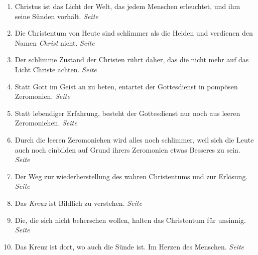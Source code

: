 \begin{enumerate}
 \item Christus ist das Licht der Welt, das jedem Menschen erleuchtet, und ihm
seine Sünden vorhält.
 \dotfill \textit{Seite \pageref{ref:02_03_gott_in_jedem}}\\
 
 \item Die Christentum von Heute sind schlimmer als die Heiden und verdienen den
Namen \textit{Christ} nicht.
 \dotfill \textit{Seite
\pageref{ref:02_08_schlimmer_als_heiden}}\\

 \item Der schlimme Zustand der Christen rührt daher, das die nicht mehr auf das
Licht Christe achten.
 \dotfill \textit{Seite
\pageref{ref:02_08_ursache_des_abfalls}}\\
 \item Statt Gott im Geist an zu beten, entartet der Gottesdienst in pompösen
Zeromonien.
 \dotfill \textit{Seite \pageref{ref:02_08_falscher_gottesdienst}}\\

 \item Statt lebendiger Erfahrung, besteht der Gottesdienst nur noch aus leeren
Zeromoniehen. \dotfill \textit{Seite \pageref{ref:02_09_lebendige_erfahrung}}\\

 \item Durch die leeren Zeromoniehen wird alles noch schlimmer, weil sich die
Leute auch noch einbilden auf Grund ihrers Zeromonien etwas Besseres zu sein.
 \dotfill \textit{Seite
\pageref{ref:02_09_selbstueberschaetzung}}\\

 \item Der Weg zur wiederherstellung des wahren Christentums und zur Erlösung.
 \dotfill \textit{Seite \pageref{ref:02_10_abhilfe}}\\
 
 \item Das \textit{Kreuz} ist Bildlich zu verstehen.
 \dotfill \textit{Seite \pageref{ref:03_01_das_kreuz}}\\
 
 \item Die, die sich nicht beherschen wollen, halten das Christentum für
unsinnig.
 \dotfill \textit{Seite \pageref{ref:03_02_leidenschaft}}\\
 
 \item Das Kreuz ist dort, wo auch die Sünde ist. Im Herzen des Menschen.
 \dotfill \textit{Seite \pageref{ref:03_03_ort_des_kreuzes}}\\
 

\end{enumerate}
